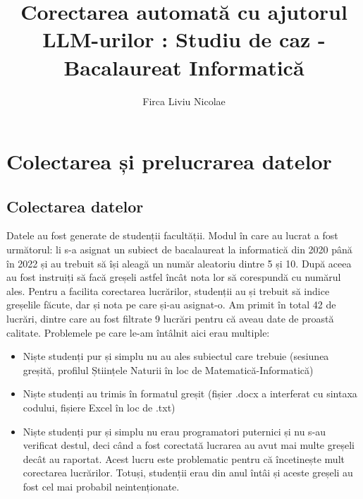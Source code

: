 \documentclass[12pt, a4paper]{report}
\title{Corectarea automată cu ajutorul LLM-urilor : Studiu de caz - Bacalaureat Informatică}
\author{Firca Liviu Nicolae}
\begin{document}
\cleardoublepage
\let\ps@plain


\restoregeometry
{}


\addtocounter{page}{1}



\tableofcontents

\cleardoublepage
\pagestyle{main}
\let\ps@plain\ps@main



\chapter{Colectarea și prelucrarea datelor}
\section{Colectarea datelor}
Datele au fost generate de studenții facultății. Modul în care au lucrat a fost următorul: li s-a asignat un subiect de bacalaureat la informatică din 2020 până în 2022 și au trebuit să își aleagă un număr aleatoriu dintre 5 și 10. După aceea au fost instruiți să facă greșeli astfel încât nota lor să corespundă cu numărul ales.  
Pentru a facilita corectarea lucrărilor, studenții au și trebuit să indice greșelile făcute, dar și nota pe care și-au asignat-o.  
Am primit în total 42 de lucrări, dintre care au fost filtrate 9 lucrări pentru că aveau date de proastă calitate.  
Problemele pe care le-am întâlnit aici erau multiple:  
\begin{itemize}
  \item Niște studenți pur și simplu nu au ales subiectul care trebuie (sesiunea greșită, profilul Științele Naturii în loc de Matematică-Informatică)
  \item Niște studenți au trimis în formatul greșit (fișier .docx a interferat cu sintaxa codului, fișiere Excel în loc de .txt)
  \item Niște studenți pur și simplu nu erau programatori puternici și nu s-au verificat destul, deci când a fost corectată lucrarea au
  avut mai multe greșeli decât au raportat. Acest lucru este problematic pentru că încetinește mult corectarea lucrărilor. Totuși, studenții erau din anul întâi și aceste greșeli au fost cel mai probabil neintenționate.
\end{itemize}
\end{document}
